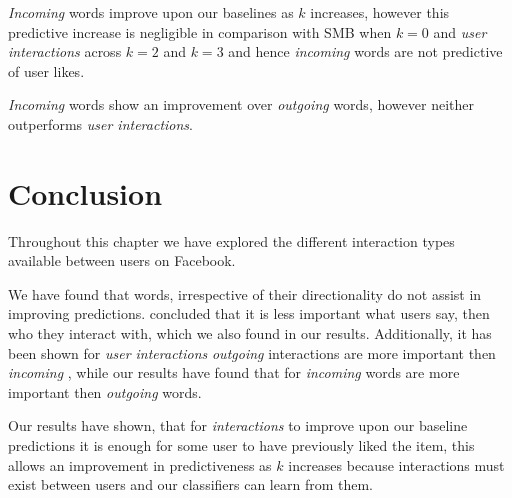 \clearpage

\emph{Incoming} words improve upon our baselines as $k$ increases, however this predictive increase is 
negligible in comparison with SMB when $k = 0$ and \emph{user interactions} across $k=2$ and $k=3$ and 
hence \emph{incoming} words are not predictive of user likes.

\emph{Incoming} words show an improvement over \emph{outgoing} words, however neither outperforms \emph{user interactions}.

\section{Conclusion}
\label{sec:conc}

Throughout this chapter we have explored the different interaction types available between users on Facebook. 

We have found that words, irrespective of their directionality do not assist in improving predictions. \cite{Anderson2012} concluded 
that it is less important what users say, then who they interact with, which we also found in our results. Additionally, it has been shown
for \emph{user interactions} \emph{outgoing} interactions are more important then \emph{incoming} \cite{www}, while our results have found that
for \emph{incoming} words are more important then \emph{outgoing} words.

Our results have shown, that for \emph{interactions} to improve upon our baseline predictions it is enough for some user to 
have previously liked the item, this allows an improvement in predictiveness as $k$ increases because 
interactions must exist between users and our classifiers can learn from them.

